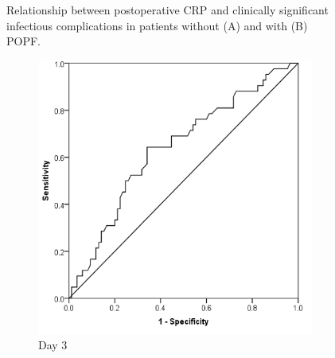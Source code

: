 \begin{figure}[t]
	\caption{Relationship between postoperative CRP and clinically significant infectious complications in patients without (A) and with (B) POPF.}
	\label{fig:crp_comp_infectious_leak}
	
\end{figure}


\clearpage
\begin{figure}[t]
	\centering
	\begin{subfigure}{0.3\textwidth}
		\centering
		\includegraphics[width=\textwidth]{Figures/crp_comp_ROC_infection_D3}
		\caption{Day 3}
		\label{fig:crp_comp_ROC_infection_D3}
	\end{subfigure}
	\begin{subfigure}{0.3\textwidth}
		\centering

\end{subfigure}
\end{figure}

